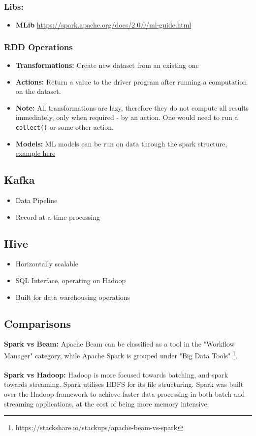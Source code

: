 \documentclass[english]{article}
\begin{document}
\subsubsection{Libs:}
\begin{itemize}
\item \textbf{MLib} \url{https://spark.apache.org/docs/2.0.0/ml-guide.html}
\end{itemize}
\subsubsection{RDD Operations}
\begin{itemize}
\item \textbf{Transformations:} Create new dataset from an existing one
\item \textbf{Actions:} Return a value to the driver program after running a computation on the dataset.
\item \textbf{Note:} All transformations are lazy, therefore they do not compute all results immediately, only when required - by an action. One would need to run a \verb"collect()" or some other action.
\item \textbf{Models:} ML models can be run on data through the spark structure, \href{https://github.com/apache/spark/blob/master/examples/src/main/python/kmeans.py}{example here}
\end{itemize}
\subsection{Kafka}
\begin{itemize}
\item Data Pipeline
\item Record-at-a-time processing
\end{itemize}
\subsection{Hive}
\begin{itemize}
\item Horizontally scalable
\item SQL Interface, operating on Hadoop
\item Built for data warehousing operations
\end{itemize}
\subsection{Comparisons}
\textbf{Spark vs Beam:} Apache Beam can be classified as a tool in the "Workflow Manager" category, while Apache Spark is grouped under "Big Data Tools" \footnote{https://stackshare.io/stackups/apache-beam-vs-spark}.\\\\
\textbf{Spark vs Hadoop:} Hadoop is more focused towards batching, and spark towards streaming. Spark utilises HDFS for its file structuring. Spark was built over the Hadoop framework to achieve faster data processing in both batch and streaming applications, at the cost of being more memory intensive.
\end{document}
